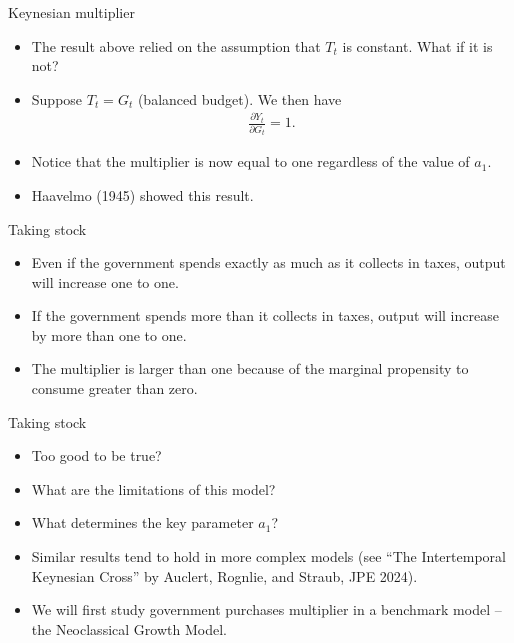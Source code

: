 \documentclass[11pt,xcolor={dvipsnames},aspectratio=159,hyperref={pdftex,pdfpagemode=UseNone,hidelinks,pdfdisplaydoctitle=true},usepdftitle=false]{beamer}
\begin{document}
\begin{frame}{Keynesian multiplier}
    \begin{itemize}
    \item The result above relied on the assumption that $T_t$ is constant. What if it is not?
    \item Suppose $T_t = G_t$ (balanced budget). We then have \begin{align*}
        \frac{\partial Y_t}{\partial G_t} = 1.
    \end{align*}
    \item Notice that the multiplier is now equal to one regardless of the value of $a_1$.
    \item Haavelmo (1945) showed this result. 
    \end{itemize}
\end{frame}

\begin{frame}{Taking stock}
    \begin{itemize}
    \item Even if the government spends exactly as much as it collects in taxes, output will increase one to one. 
    \item If the government spends more than it collects in taxes, output will increase by more than one to one.
    \item The multiplier is larger than one because of the marginal propensity to consume greater than zero.
    \end{itemize}
\end{frame}

\begin{frame}{Taking stock}
    \begin{itemize}
    \item Too good to be true?  
    \item What are the limitations of this model?
    \item What determines the key parameter $a_1$?
    \item Similar results tend to hold in more complex models (see ``The Intertemporal Keynesian Cross'' by Auclert, Rognlie, and Straub, JPE 2024).
    \item We will first study government purchases multiplier in a benchmark model -- the Neoclassical Growth Model. 
    \end{itemize}
\end{frame}

\begin{frame}
\end{frame}
\end{document}
